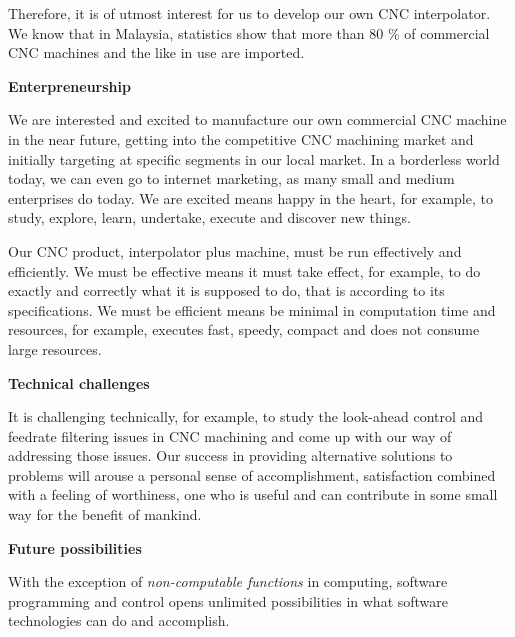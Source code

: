\begin{tcolorbox}[colback=green!15!white,colframe=red!75!black,title=Research consideration no. 1]		
Therefore, it is of utmost interest for us to develop our own CNC interpolator. We know that in Malaysia, statistics show that more than 80 \% of commercial CNC machines and the like in use are imported. 
\end{tcolorbox}
	
\textbf{Enterpreneurship}
\vspace*{1\baselineskip}
	
We are interested and excited to manufacture our own commercial CNC machine in the near future, getting into the competitive CNC machining market and initially targeting at specific segments in our local market. In a borderless world today, we can even go to internet marketing, as many small and medium enterprises do today. We are excited means happy in the heart, for example, to study, explore, learn, undertake, execute and discover new things. 
\vspace*{1\baselineskip}
	
Our CNC product, interpolator plus machine, must be run effectively and efficiently. We must be effective means it must take effect, for example, to do exactly and correctly what it is supposed to do, that is according to its specifications. We must be efficient means be minimal in computation time and resources, for example, executes fast, speedy, compact and does not consume large resources.
\vspace*{1\baselineskip}

\textbf{Technical challenges}
\vspace*{1\baselineskip}
	
It is challenging technically, for example, to study the look-ahead control and feedrate filtering issues in CNC machining and come up with our way of addressing those issues.  Our success in providing alternative solutions to problems will arouse a personal sense of accomplishment, satisfaction combined with a feeling of worthiness, one who is useful and can contribute in some small way for the benefit of mankind. 
\vspace*{1\baselineskip}

\textbf{Future possibilities}
\vspace*{1\baselineskip}
	
With the exception of \textit{non-computable functions} in computing, software programming and control opens unlimited possibilities in what software technologies can do and accomplish. 
\vspace*{1\baselineskip}

